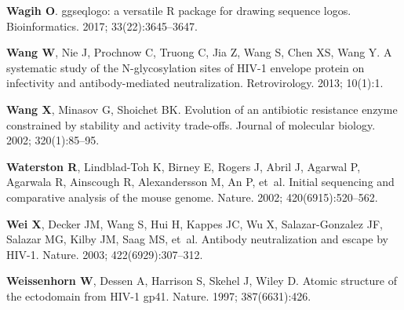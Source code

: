 \documentclass[9pt]{elife}
\begin{document}
\begin{thebibliography}{114}
\textbf{\color{eLifeMediumGrey} Wagih O}.
\newblock ggseqlogo: a versatile {R} package for drawing sequence logos.
\newblock Bioinformatics.  2017; 33(22):3645--3647.

\textbf{\color{eLifeMediumGrey} Wang W}, Nie J, Prochnow C, Truong C, Jia Z,
  Wang S, Chen XS, Wang Y.
\newblock A systematic study of the N-glycosylation sites of HIV-1 envelope
  protein on infectivity and antibody-mediated neutralization.
\newblock Retrovirology.  2013; 10(1):1.

\textbf{\color{eLifeMediumGrey} Wang X}, Minasov G, Shoichet BK.
\newblock Evolution of an antibiotic resistance enzyme constrained by stability
  and activity trade-offs.
\newblock Journal of molecular biology.  2002; 320(1):85--95.

\textbf{\color{eLifeMediumGrey} Waterston R}, Lindblad-Toh K, Birney E, Rogers
  J, Abril J, Agarwal P, Agarwala R, Ainscough R, Alexandersson M, An P, et~al.
\newblock Initial sequencing and comparative analysis of the mouse genome.
\newblock Nature.  2002; 420(6915):520--562.

\textbf{\color{eLifeMediumGrey} Wei X}, Decker JM, Wang S, Hui H, Kappes JC, Wu
  X, Salazar-Gonzalez JF, Salazar MG, Kilby JM, Saag MS, et~al.
\newblock Antibody neutralization and escape by HIV-1.
\newblock Nature.  2003; 422(6929):307--312.

\textbf{\color{eLifeMediumGrey} Weissenhorn W}, Dessen A, Harrison S, Skehel J,
  Wiley D.
\newblock Atomic structure of the ectodomain from HIV-1 gp41.
\newblock Nature.  1997; 387(6631):426.


\end{thebibliography}
\end{document}
